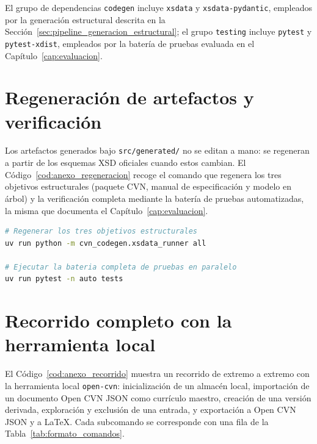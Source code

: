 El grupo de dependencias \texttt{codegen} incluye \texttt{xsdata} y
\texttt{xsdata-pydantic}, empleados por la generación estructural descrita en
la Sección~\ref{sec:pipeline_generacion_estructural}; el grupo
\texttt{testing} incluye \texttt{pytest} y \texttt{pytest-xdist}, empleados
por la batería de pruebas evaluada en el Capítulo~\ref{cap:evaluacion}.

\section{Regeneración de artefactos y verificación}
\label{sec:anexo_instalacion_regeneracion}

Los artefactos generados bajo \texttt{src/generated/} no se editan a mano:
se regeneran a partir de los esquemas XSD oficiales cuando estos cambian. El
Código~\ref{cod:anexo_regeneracion} recoge el comando que regenera los tres
objetivos estructurales (paquete CVN, manual de especificación y modelo en
árbol) y la verificación completa mediante la batería de pruebas
automatizadas, la misma que documenta el Capítulo~\ref{cap:evaluacion}.

\begin{code}[htbp]
\begin{lstlisting}[language=bash, basicstyle=\footnotesize\ttfamily, breaklines=true]
# Regenerar los tres objetivos estructurales
uv run python -m cvn_codegen.xsdata_runner all

# Ejecutar la bateria completa de pruebas en paralelo
uv run pytest -n auto tests
\end{lstlisting}
\caption{Regeneración de artefactos estructurales y verificación por pruebas.}
\label{cod:anexo_regeneracion}
\end{code}

\section{Recorrido completo con la herramienta local}
\label{sec:anexo_instalacion_recorrido}

El Código~\ref{cod:anexo_recorrido} muestra un recorrido de extremo a
extremo con la herramienta local \texttt{open-cvn}: inicialización de un
almacén local, importación de un documento Open CVN JSON como currículo
maestro, creación de una versión derivada, exploración y exclusión de una
entrada, y exportación a Open CVN JSON y a LaTeX. Cada subcomando se
corresponde con una fila de la Tabla~\ref{tab:formato_comandos}.

